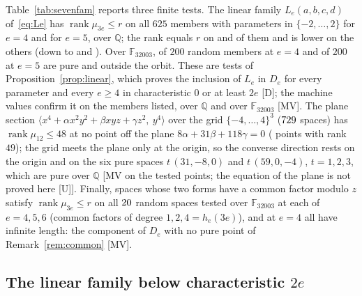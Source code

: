 \documentclass[11pt]{article}
\theoremstyle{definition}
\theoremstyle{remark}
\newcommand{\Q}{\mathbb{Q}}
\newcommand{\F}{\mathbb{F}}
\begin{document}
Table~\ref{tab:sevenfam} reports three finite tests. The linear family $L_e(a,b,c,d)$ of~\eqref{eq:Le} has $\operatorname{rank}\mu_{3e}\le r$ on all $625$ members with parameters in $\{-2,\dots,2\}$ for $e=4$ and for $e=5$, over $\Q$; the rank equals $r$ on \nsevenLQQAtFour{} and \nsevenLQQAtFive{} of them and is lower on the others (down to \nsevenLQQMinFour{} and \nsevenLQQMinFive{}). Over $\F_{32003}$, \nsevenLGFPureFour{} of $200$ random members at $e=4$ and \nsevenLGFPureFive{} of $200$ at $e=5$ are pure and outside the orbit. These are tests of Proposition~\ref{prop:linear}, which proves the inclusion of $L_e$ in $D_e$ for every parameter and every $e\ge4$ in characteristic $0$ or at least $2e$ [D]; the machine values confirm it on the members listed, over $\Q$ and over $\F_{32003}$ [MV]. The plane section $\langle x^4+\alpha x^2y^2+\beta xyz+\gamma z^2,\ y^4\rangle$ over the grid $\{-4,\dots,4\}^3$ ($729$ spaces) has $\operatorname{rank}\mu_{12}\le48$ at no point off the plane $8\alpha+31\beta+118\gamma=0$ (\nsevenGridOff{} points with rank $49$); the grid meets the plane only at the origin, so the converse direction rests on the origin and on the six pure spaces $t\,(31,-8,0)$ and $t\,(59,0,-4)$, $t=1,2,3$, which are pure over $\Q$ [MV on the tested points; the equation of the plane is not proved here [U]]. Finally, spaces whose two forms have a common factor modulo $z$ satisfy $\operatorname{rank}\mu_{3e}\le r$ on all $20$ random spaces tested over $\F_{32003}$ at each of $e=4,5,6$ (common factors of degree $1,2,4=h_e(3e)$), and at $e=4$ all have infinite length: the component of $D_e$ with no pure point of Remark~\ref{rem:common} [MV].

\begin{table}[htbp]
\centering\footnotesize

\caption{Finite tests at the power pair: the linear family $L_e$, the plane section $\Pi$ and the common-factor locus; the number of spaces tested, with $\operatorname{rank}\mu_{3e}\le r$, with $\operatorname{rank}\mu_{3e}=r$, and pure and outside the orbit (a dash where purity was not tested); all members satisfy the rank bound, and the section has one space with rank at most $r$ among $729$, the origin.}
\label{tab:sevenfam}
\end{table}

\subsection{The linear family below characteristic \texorpdfstring{$2e$}{2e}}
\label{sec:reslf}
\end{document}
